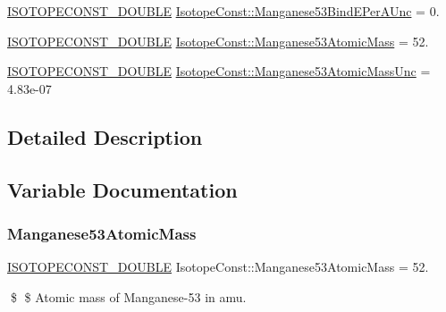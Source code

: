 \begin{DoxyCompactItemize}
\mbox{\hyperlink{group___isotope_const-_macros_ga8f45a7272ce02c0b4c65c44636ed719a}{I\+S\+O\+T\+O\+P\+E\+C\+O\+N\+S\+T\+\_\+\+D\+O\+U\+B\+LE}} \mbox{\hyperlink{group___isotope_const-_manganese-_mn53_ga0c2db3c6ce0b06fa836f1487d7df5e12}{Isotope\+Const\+::\+Manganese53\+Bind\+E\+Per\+A\+Unc}} = 0.
\item 
\mbox{\hyperlink{group___isotope_const-_macros_ga8f45a7272ce02c0b4c65c44636ed719a}{I\+S\+O\+T\+O\+P\+E\+C\+O\+N\+S\+T\+\_\+\+D\+O\+U\+B\+LE}} \mbox{\hyperlink{group___isotope_const-_manganese-_mn53_gaedfb59f28919173018cfe741c5682fb2}{Isotope\+Const\+::\+Manganese53\+Atomic\+Mass}} = 52.
\item 
\mbox{\hyperlink{group___isotope_const-_macros_ga8f45a7272ce02c0b4c65c44636ed719a}{I\+S\+O\+T\+O\+P\+E\+C\+O\+N\+S\+T\+\_\+\+D\+O\+U\+B\+LE}} \mbox{\hyperlink{group___isotope_const-_manganese-_mn53_ga0f5049b382aec09573d05a42cc3a824a}{Isotope\+Const\+::\+Manganese53\+Atomic\+Mass\+Unc}} = 4.\+83e-\/07
\end{DoxyCompactItemize}


\subsection{Detailed Description}


\subsection{Variable Documentation}
\mbox{\label{group___isotope_const-_manganese-_mn53_gaedfb59f28919173018cfe741c5682fb2}} 
\subsubsection{\texorpdfstring{Manganese53\+Atomic\+Mass}{Manganese53AtomicMass}}
{\footnotesize\ttfamily \mbox{\hyperlink{group___isotope_const-_macros_ga8f45a7272ce02c0b4c65c44636ed719a}{I\+S\+O\+T\+O\+P\+E\+C\+O\+N\+S\+T\+\_\+\+D\+O\+U\+B\+LE}} Isotope\+Const\+::\+Manganese53\+Atomic\+Mass = 52.}

\$ \$ Atomic mass of Manganese-\/53 in amu. \mbox{\label{group___isotope_const-_manganese-_mn53_ga0f5049b382aec09573d05a42cc3a824a}} 
